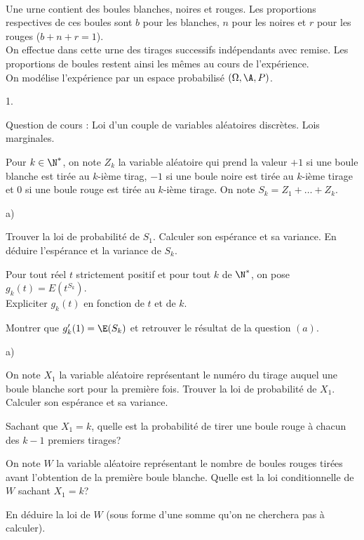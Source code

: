 \documentclass[11pt]{article}%
\begin{document}
\newpage


\begin{exerciceAP}~\\
  Une urne contient des boules blanches, noires et rouges. Les
  proportions respectives de ces boules sont $b$ pour les blanches,
  $n$ pour les noires et $r$ pour les rouges ($b + n + r = 1$).\\
  On effectue dans cette urne des tirages successifs indépendants avec
  remise. Les proportions de boules restent ainsi les mêmes au cours
  de l'expérience. \\
  On modélise l'expérience par un espace probabilisé $(\Omega , \A ,
  P)$.

  \begin{noliste}{1.}
    \setlength{\itemsep}{2mm}
  \item Question de cours : Loi d'un couple de variables aléatoires
    discrètes. Lois marginales.
  \item Pour $k \in \N^*$, on note $Z_k$ la variable aléatoire qui
    prend la valeur $+1$ si une boule blanche est tirée au $k$-ième
    tirag, $-1$ si une boule noire est tirée au $k$-ième tirage et 0
    si une boule rouge est tirée au $k$-ième tirage. On note $S_k =
    Z_1 + \dots + Z_k$.
    \begin{noliste}{a)}
    \setlength{\itemsep}{2mm} 
    \item Trouver la loi de probabilité de $S_1$. Calculer son
      espérance et sa variance. En déduire l'espérance et la variance
      de $S_k$.
    \item Pour tout réel $t$ strictement positif et pour tout $k$ de
      $\N^*$, on pose $g_k(t) = E \left(t^{S_k} \right)$. \\
      Expliciter $g_k(t)$ en fonction de $t$ et de $k$.
    \item Montrer que $g_k'(1) = \E(S_k)$ et retrouver le résultat de
      la question $(a)$.
    \end{noliste}

  \item 
    \begin{noliste}{a)}
    \setlength{\itemsep}{2mm}
    \item On note $X_1$ la variable aléatoire représentant le numéro
      du tirage auquel une boule blanche sort pour la première
      fois. Trouver la loi de probabilité de $X_1$. Calculer son
      espérance et sa variance.
    \item Sachant que $X_1 = k$, quelle est la probabilité de tirer
      une boule rouge à chacun des $k-1$ premiers tirages?
    \item On note $W$ la variable aléatoire représentant le nombre de
      boules rouges tirées avant l'obtention de la première boule
      blanche. Quelle est la loi conditionnelle de $W$ sachant $X_1 =
      k$?
    \item En déduire la loi de $W$ (sous forme d'une somme qu'on ne
      cherchera pas à calculer).
    \end{noliste}


\end{noliste}
\end{exerciceAP}
\end{document}
